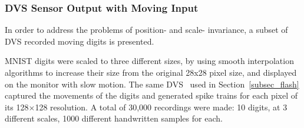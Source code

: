 \documentclass{frontiersENG} %
\begin{document}
\subsubsection{DVS Sensor Output with Moving Input}
In order to address the problems of position- and scale- invariance, a subset of DVS recorded moving digits is presented.

MNIST digits were scaled to three different sizes, by using smooth interpolation algorithms to increase their size from the original 28x28 pixel size, and displayed on the monitor with slow motion. 
The same DVS~\citep{serrano2013128} used in Section~\ref{subsec_flash} captured the movements of the digits and generated spike trains for each pixel of its 128$\times$128 resolution.
A total of 30,000 recordings were made: 10 digits, at 3 different scales, 1000 different handwritten samples for each.
\end{document}
